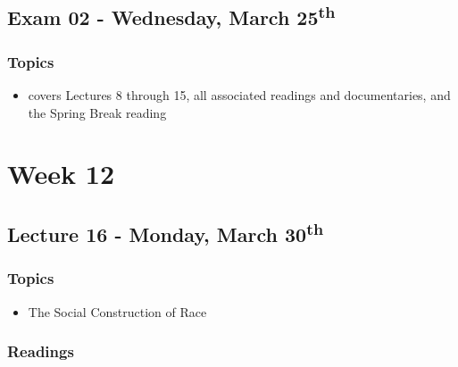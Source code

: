 \documentclass[]{book}
\providecommand{\tightlist}{%
  \setlength{\itemsep}{0pt}\setlength{\parskip}{0pt}}
\begin{document}
\hypertarget{exam-02---wednesday-march-25th}{%
\subsection*{\texorpdfstring{Exam 02 - Wednesday, March 25\textsuperscript{th}}{Exam 02 - Wednesday, March 25th}}\label{exam-02---wednesday-march-25th}}

\hypertarget{topics-19}{%
\subsubsection*{Topics}\label{topics-19}}

\begin{itemize}
\tightlist
\item
  covers Lectures 8 through 15, all associated readings and documentaries, and the Spring Break reading
\end{itemize}

\newpage

\hypertarget{week-12}{%
\section*{Week 12}\label{week-12}}

\hypertarget{lecture-16---monday-march-30th}{%
\subsection*{\texorpdfstring{Lecture 16 - Monday, March 30\textsuperscript{th}}{Lecture 16 - Monday, March 30th}}\label{lecture-16---monday-march-30th}}

\hypertarget{topics-20}{%
\subsubsection*{Topics}\label{topics-20}}

\begin{itemize}
\tightlist
\item
  The Social Construction of Race
\end{itemize}

\hypertarget{readings-18}{%
\subsubsection*{Readings}\label{readings-18}}
\end{document}
